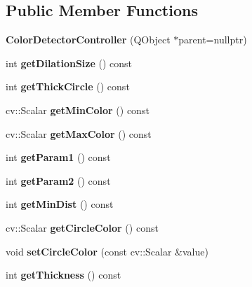 \subsection*{Public Member Functions}
\begin{DoxyCompactItemize}
\item 
\mbox{\label{class_color_detector_controller_a2f35953352a4cba8a1907ca46cf08b62}} 
{\bfseries Color\+Detector\+Controller} (Q\+Object $\ast$parent=nullptr)
\item 
\mbox{\label{class_color_detector_controller_afa394dd4972d89f69f06e10bd7992782}} 
int {\bfseries get\+Dilation\+Size} () const
\item 
\mbox{\label{class_color_detector_controller_a7393d5517b607068db7f2ea78484c282}} 
int {\bfseries get\+Thick\+Circle} () const
\item 
\mbox{\label{class_color_detector_controller_a8d8b3838562b95f99e17633e3d4c0e12}} 
cv\+::\+Scalar {\bfseries get\+Min\+Color} () const
\item 
\mbox{\label{class_color_detector_controller_a11c07f34537bc17ff113149f94bb9182}} 
cv\+::\+Scalar {\bfseries get\+Max\+Color} () const
\item 
\mbox{\label{class_color_detector_controller_a8cc70b5d53544e5d03ac10b11743c9f5}} 
int {\bfseries get\+Param1} () const
\item 
\mbox{\label{class_color_detector_controller_a3bea337471bf91256e55c1f729646a32}} 
int {\bfseries get\+Param2} () const
\item 
\mbox{\label{class_color_detector_controller_adaf0bc83b6235e0e9997b34ab757f6fd}} 
int {\bfseries get\+Min\+Dist} () const
\item 
\mbox{\label{class_color_detector_controller_a102cd879ea47cd3143316cd15b752bb0}} 
cv\+::\+Scalar {\bfseries get\+Circle\+Color} () const
\item 
\mbox{\label{class_color_detector_controller_ac6be48086945d05c1eda3a02b24fd2a9}} 
void {\bfseries set\+Circle\+Color} (const cv\+::\+Scalar \&value)
\item 
\mbox{\label{class_color_detector_controller_a0ca740b6e9e02ad320231c613763f286}} 
int {\bfseries get\+Thickness} () const
\end{DoxyCompactItemize}
